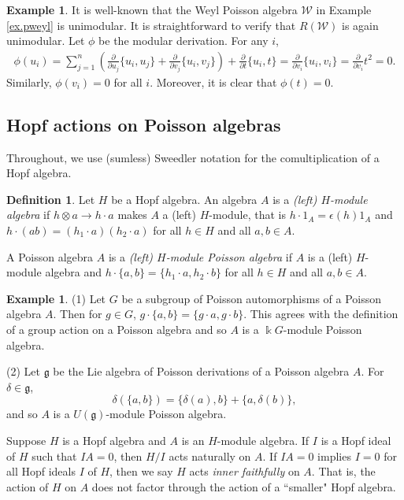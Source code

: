 \documentclass[reqno]{amsart}
\numberwithin{equation}{section}
\theoremstyle{definition}
\newtheorem{definition}[theorem]{Definition}
\newtheorem{example}[theorem]{Example}
\newcommand\tensor{\otimes}
\newcommand\kk{\Bbbk}
\newcommand\pw{\mathcal W}
\newcommand\fg{\mathfrak g}
\begin{document}
\begin{example}
It is well-known that the Weyl Poisson algebra $\pw$ in Example \ref{ex.pweyl} is unimodular. It is straightforward to verify that $R(\pw)$ is again unimodular. Let $\phi$ be the modular derivation. For any $i$,
\begin{align*}
    \phi(u_i) = \sum_{j=1}^n \left( \frac{\partial}{\partial u_j}\{u_i,u_j\} + \frac{\partial}{\partial v_j}\{u_i,v_j\} \right) + \frac{\partial}{\partial t}\{u_i,t\}
        = \frac{\partial}{\partial v_i}\{u_i,v_i\}
        = \frac{\partial}{\partial v_i} t^2 = 0.
\end{align*}
Similarly, $\phi(v_i)=0$ for all $i$. Moreover, it is clear that $\phi(t)=0$.
\end{example}

\subsection{Hopf actions on Poisson algebras}
Throughout, we use (sumless) Sweedler notation for the comultiplication of a Hopf algebra. 

\begin{definition}
Let $H$ be a Hopf algebra. An algebra $A$ is a \emph{(left) $H$-module algebra} if $h \tensor a \to h \cdot a$ makes $A$ a (left) $H$-module, that is $h \cdot 1_A = \epsilon(h) 1_A$ and $h \cdot (ab) = (h_1 \cdot a)(h_2 \cdot a)$ for all $h \in H$ and all $a,b \in A$.

A Poisson algebra $A$ is a \emph{(left) $H$-module Poisson algebra} if $A$ is a (left) $H$-module algebra and $h \cdot \{a,b\} = \{ h_1 \cdot a, h_2 \cdot b \}$ for all $h \in H$ and all $a,b \in A$.
\end{definition}

\begin{example}
(1) Let $G$ be a subgroup of Poisson automorphisms of a Poisson algebra $A$. Then for $g \in G$, $g \cdot \{a,b\} = \{ g \cdot a, g \cdot b\}$. This agrees with the definition of a group action on a Poisson algebra \cite{AF} and so $A$ is a $\kk G$-module Poisson algebra.

(2) Let $\fg$ be the Lie algebra of Poisson derivations of a Poisson algebra $A$. For $\delta \in \fg$,
\[ \delta(\{a,b\}) = \{ \delta(a), b \} + \{ a, \delta(b) \},\]
and so $A$ is a $U(\fg)$-module Poisson algebra.
\end{example}

Suppose $H$ is a Hopf algebra and $A$ is an $H$-module algebra.
If $I$ is a Hopf ideal of $H$ such that $IA=0$, then $H/I$ acts naturally on $A$.
If $IA=0$ implies $I=0$ for all Hopf ideals $I$ of $H$, then we say $H$
acts \emph{inner faithfully} on $A$.  That is, the action of $H$ on $A$ does
not factor through the action of a ``smaller" Hopf algebra.
\end{document}
